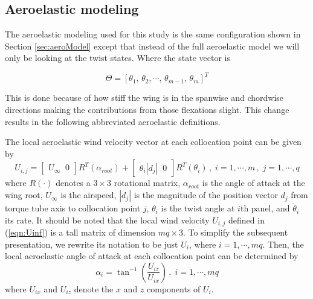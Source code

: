 \documentclass[11pt]{ucthesis}
\begin{document}
\subsection{Aeroelastic modeling}

The aeroelastic modeling used for this study is the same configuration shown in Section \ref{sec:aeroModel} except that instead of the full aeroelastic model we will only be looking at the twist states. Where the state vector is 

\begin{equation}
\Theta = [\theta_1,\,\theta_2,\dotsb,\,\theta_{m-1},\,\theta_m]^T
\label{eqn:state}
\end{equation}

This is done because of how stiff the wing is in the spanwise and chordwise directions making the contributions from those flexations slight. This change results in the following abbreviated aeroelastic definitions.

The local aeroelastic wind velocity vector at each collocation point can be given by
\begin{equation}
U_{i,j} =\begin{bmatrix}U_{\infty} \;\; 0\end{bmatrix} R^T(\alpha_{root}) + \begin{bmatrix}\dot{\theta}_{i} |d_{j}| \;\; 0\end{bmatrix} R^T (\theta_{i}) \,,\;i=1,\cdots, m\,,\;j=1,\cdots, q
\label{eqn:Uinf}
\end{equation}
where $R(\cdot)$ denotes a $3\times 3$ rotational matrix, $\alpha_{root}$ is the angle of attack at the wing root, $U_{\infty}$ is the airspeed, $|d_{j}|$ is the magnitude of the position vector $d_{j}$ from torque tube axis to collocation point $j$, $\theta_i$ is the twist angle at $i$th panel, and $\dot{\theta}_i$ its rate. It should be noted that the local wind velocity $U_{i,j}$ defined in (\ref{eqn:Uinf}) is a tall matrix of dimension $mq \times 3$. To simplify the subsequent presentation, we rewrite its notation to be just $U_i$, where $i=1,\cdots,mq$. Then, the local aeroelastic angle of attack at each collocation point can be determined by
\begin{equation}
\alpha_{i} = \tan^{-1} \left (\frac{U_{iz}}{U_{ix}} \right) \,,\;i=1,\cdots, mq
\label{eqn:alpha_aero}
\end{equation}
where $U_{ix}$ and $U_{iz}$ denote the $x$ and $z$ components of $U_{i}$. 
\end{document}
